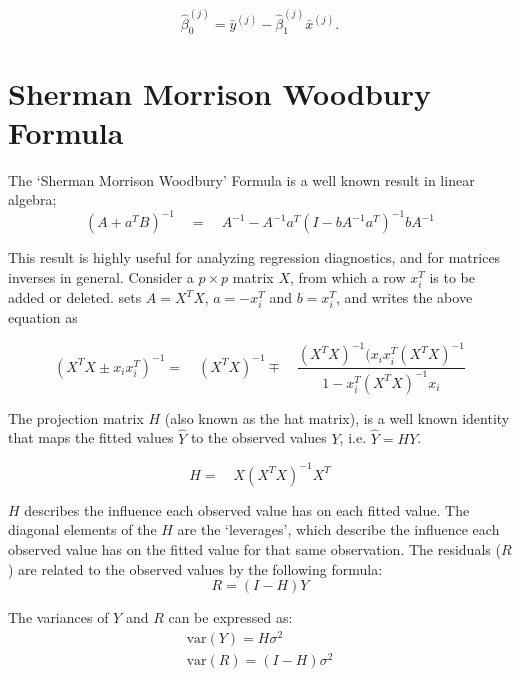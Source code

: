 \documentclass[MAIN.tex]{subfiles}
\begin{document}
	\begin{equation}
	\hat{\beta}_{0}^{(j)}=\bar{y}^{(j)}-\hat{\beta}_{1}^{(j)}\bar{x}^{(j)}.
	\end{equation}
	
	
	
	



\section{Sherman Morrison Woodbury Formula} %

The `Sherman Morrison Woodbury' Formula is a well known result in
linear algebra;
\begin{equation}
(A+a^{T}B)^{-1} \quad = \quad A^{-1}-
A^{-1}a^{T}(I-bA^{-1}a^{T})^{-1}bA^{-1}
\end{equation}

This result is highly useful for analyzing regression diagnostics,
and for matrices inverses in general. Consider a $p \times p$
matrix $X$, from which a row $x_{i}^{T}$ is to be added or
deleted. \citet{CookWeisberg} sets $A = X^{T}X$, $a=-x_{i}^{T}$
and $b=x_{i}^{T}$, and writes the above equation as

\begin{equation}
(X^{T}X \pm x_{i}x_{i}^{T})^{-1} = \quad(X^{T}X )^{-1} \mp \quad
\frac{(X^{T}X)^{-1}(x_{i}x_{i}^{T}(X^{T}X)^{-1}}{1-x_{i}^{T}(X^{T}X)^{-1}x_{i}}
\end{equation}

The projection matrix $H$ (also known as the hat matrix), is a
well known identity that maps the fitted values $\hat{Y}$ to the
observed values $Y$, i.e. $\hat{Y} = HY$.

\begin{equation}
H =\quad X(X^{T}X)^{-1}X^{T}
\end{equation}

$H$ describes the influence each observed value has on each fitted value. The diagonal elements of the $H$ are the `leverages', which describe the influence each observed value has on the fitted value for that same observation. The residuals ($R$) are related to the observed values by the following formula:
\begin{equation}
R = (I-H)Y
\end{equation}

The variances of $Y$ and $R$ can be expressed as:
\begin{eqnarray}
\mbox{var}(Y) = H\sigma^{2} \nonumber\\
\mbox{var}(R) = (I-H)\sigma^{2}
\end{eqnarray}
\end{document}
